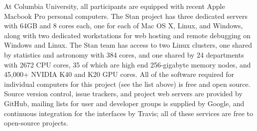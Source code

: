 \documentclass[11pt]{article}
\begin{document}
At Columbia University, all participants are equipped with recent
Apple Macbook Pro personal computers.  The Stan project has three
dedicated servers with 64GB and 8 cores each, one for each of Mac OS
X, Linux, and Windows, along with two dedicated workstations for web
hosting and remote debugging on Windows and Linux.  The Stan team has
access to two Linux clusters, one shared by statistics and astronomy
with 384 cores, and one shared by 24 departments with 2672 CPU cores,
35 of which are high end 256-gigabyte memory nodes, and 45,000+ NVIDIA
K40 and K20 GPU cores.  All of the software required for individual
computers for this project (see the list above) is free and open
source.  Source version control, issue trackers, and project web
servers are provided by GitHub, mailing lists for user and developer
groups is supplied by Google, and continuous integration for the
interfaces by Travis;  all of these services are free to open-source
projects.
\end{document}
